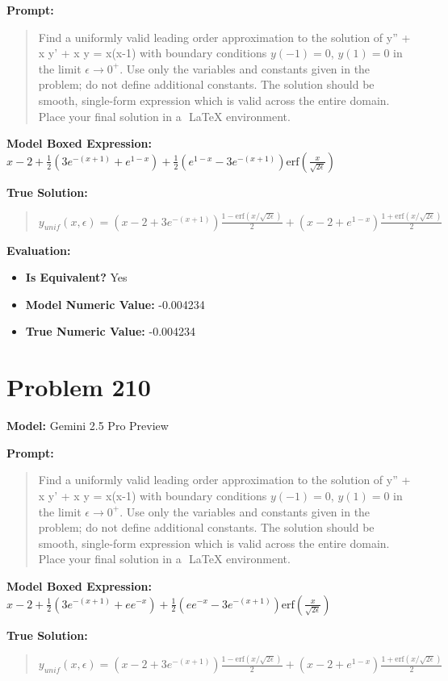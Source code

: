 \documentclass{article}
\begin{document}
{\textbf{Prompt:}
\begin{quote}
Find a uniformly valid leading order approximation to the solution of \epsilon y'' + x y' + x y = x(x-1) with boundary conditions $y(-1) = 0$, $y(1) = 0$ in the limit $\epsilon \to 0^+$. Use only the variables and constants given in the problem; do not define additional constants. The solution should be smooth, single-form expression which is valid across the entire domain. Place your final solution in a $\boxed{}$ LaTeX environment.
\end{quote}
\textbf{Model Boxed Expression:} $x-2 + \frac{1}{2}\left(3e^{-(x+1)}+e^{1-x}\right) + \frac{1}{2}\left(e^{1-x}-3e^{-(x+1)}\right)\text{erf}\left(\frac{x}{\sqrt{2\epsilon}}\right)$

\textbf{True Solution:}
\begin{quote}
$y_{unif}(x, \epsilon) = \left(x - 2 + 3e^{-(x+1)}\right) \frac{1-\text{erf}(x/\sqrt{2\epsilon})}{2} + \left(x - 2 + e^{1-x}\right) \frac{1+\text{erf}(x/\sqrt{2\epsilon})}{2}$
\end{quote}

\textbf{Evaluation:}
\begin{itemize}
\item \textbf{Is Equivalent?} Yes
\item \textbf{Model Numeric Value:} -0.004234
\item \textbf{True Numeric Value:} -0.004234
\end{itemize}
\vspace{1cm}
\section*{Problem 210}
\textbf{Model:} Gemini 2.5 Pro Preview

\textbf{Prompt:}
\begin{quote}
Find a uniformly valid leading order approximation to the solution of \epsilon y'' + x y' + x y = x(x-1) with boundary conditions $y(-1) = 0$, $y(1) = 0$ in the limit $\epsilon \to 0^+$. Use only the variables and constants given in the problem; do not define additional constants. The solution should be smooth, single-form expression which is valid across the entire domain. Place your final solution in a $\boxed{}$ LaTeX environment.
\end{quote}
\textbf{Model Boxed Expression:} $x-2 + \frac{1}{2}(3e^{-(x+1)}+ee^{-x}) + \frac{1}{2}(ee^{-x}-3e^{-(x+1)}) \text{erf}\left(\frac{x}{\sqrt{2\epsilon}}\right)$

\textbf{True Solution:}
\begin{quote}
$y_{unif}(x, \epsilon) = \left(x - 2 + 3e^{-(x+1)}\right) \frac{1-\text{erf}(x/\sqrt{2\epsilon})}{2} + \left(x - 2 + e^{1-x}\right) \frac{1+\text{erf}(x/\sqrt{2\epsilon})}{2}$
\end{quote}

}
\end{document}
